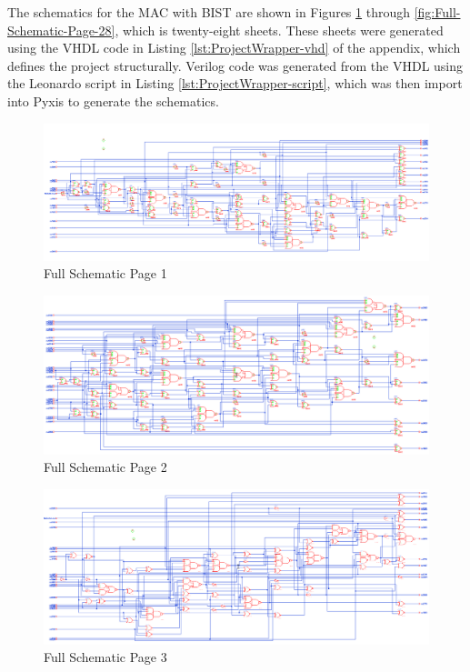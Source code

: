 \documentclass[11pt]{article}
\begin{document}
		The schematics for the MAC with BIST are shown in Figures \ref{fig:Full-Schematic-Page-1} through \ref{fig:Full-Schematic-Page-28}, which is twenty-eight sheets. These sheets were generated using the VHDL code in Listing \ref{lst:ProjectWrapper-vhd} of the appendix, which defines the project structurally. Verilog code was generated from the VHDL using the Leonardo script in Listing \ref{lst:ProjectWrapper-script}, which was then import into Pyxis to generate the schematics.
		
		
		\begin{figure}[H] 
			\centering 
			\includegraphics[width=\textwidth,height=\dimexpr\textheight-4\baselineskip-\abovecaptionskip-\belowcaptionskip\relax,keepaspectratio]{"Pictures/Full Schematic Page 1"}
			\caption{Full Schematic Page 1} 
			\label{fig:Full-Schematic-Page-1} 
		\end{figure}
	
		\begin{figure}[H] 
			\centering 
			\includegraphics[width=\textwidth,height=\dimexpr\textheight-4\baselineskip-\abovecaptionskip-\belowcaptionskip\relax,keepaspectratio]{"Pictures/Full Schematic Page 2"}
			\caption{Full Schematic Page 2} 
			\label{fig:Full-Schematic-Page-2} 
		\end{figure}
	
		\begin{figure}[H] 
			\centering 
			\includegraphics[width=\textwidth,height=\dimexpr\textheight-4\baselineskip-\abovecaptionskip-\belowcaptionskip\relax,keepaspectratio]{"Pictures/Full Schematic Page 3"}
			\caption{Full Schematic Page 3} 
			\label{fig:Full-Schematic-Page-3} 
		\end{figure}
		
\end{document}
